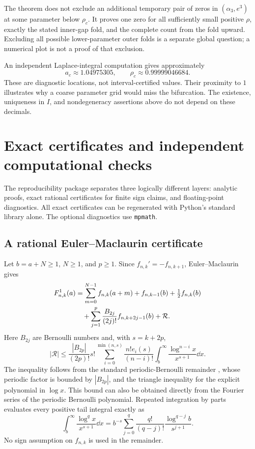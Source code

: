 \begin{remark}
The theorem does not exclude an additional temporary pair of zeros in $(\alpha_3,e^3)$ at some parameter below $\rho_c$. It proves one zero for all sufficiently small positive $\rho$, exactly the stated inner-gap fold, and the complete count from the fold upward. Excluding all possible lower-parameter outer folds is a separate global question; a numerical plot is not a proof of that exclusion.
\end{remark}

An independent Laplace-integral computation gives approximately
\[
 a_c\approx1.04975305,\qquad \rho_c\approx0.99999046684.
\]
These are diagnostic locations, not interval-certified values. Their proximity to $1$ illustrates why a coarse parameter grid would miss the bifurcation. The existence, uniqueness in $I$, and nondegeneracy assertions above do not depend on these decimals.

\section{Exact certificates and independent computational checks}\label{lerchbd:sec:certificates}
The reproducibility package separates three logically different layers: analytic proofs, exact rational certificates for finite sign claims, and floating-point diagnostics. All exact certificates can be regenerated with Python's standard library alone. The optional diagnostics use \texttt{mpmath}.

\subsection{A rational Euler--Maclaurin certificate}
Let $b=a+N\ge1$, $N\ge1$, and $p\ge1$. Since $f_{n,k}'=-f_{n,k+1}$, Euler--Maclaurin gives
\begin{align}\label{lerchbd:eq:EM}
 F_{n,k}^{1}(a)
 &=\sum_{m=0}^{N-1}f_{n,k}(a+m)+f_{n,k-1}(b)+\tfrac12f_{n,k}(b)\notag\\
 &\quad+\sum_{j=1}^{p}\frac{B_{2j}}{(2j)!}f_{n,k+2j-1}(b)+\mathcal R.
\end{align}
Here $B_{2j}$ are Bernoulli numbers and, with $s=k+2p$,
\begin{equation}\label{lerchbd:eq:EMbound}
 |\mathcal R|\le\frac{|B_{2p}|}{(2p)!}
 s!\sum_{i=0}^{\min(n,s)}\frac{n!e_i(s)}{(n-i)!}
 \int_b^\infty\frac{\log^{n-i}x}{x^{s+1}}\dd x.
\end{equation}
The inequality follows from the standard periodic-Bernoulli remainder \cite{lerchbd:em}, whose periodic factor is bounded by $|B_{2p}|$, and the triangle inequality for the explicit polynomial in $\log x$. This bound can also be obtained directly from the Fourier series of the periodic Bernoulli polynomial. Repeated integration by parts evaluates every positive tail integral exactly as
\begin{equation}\label{lerchbd:eq:logtail}
 \int_b^\infty\frac{\log^q x}{x^{s+1}}\dd x
 =b^{-s}\sum_{j=0}^q\frac{q!}{(q-j)!}\frac{\log^{q-j}b}{s^{j+1}}.
\end{equation}
No sign assumption on $f_{n,k}$ is used in the remainder.

